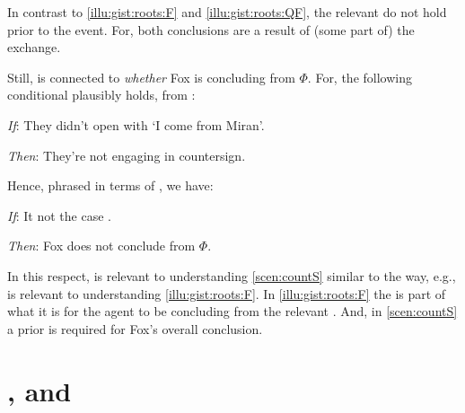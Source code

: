 \begin{note}
  In contrast to  \ref{illu:gist:roots:F} and \ref{illu:gist:roots:QF}, the relevant \fofr{} do not hold prior to the event.
  For, both conclusions are a result of (some part of) the exchange.

  Still,  is connected to \emph{whether} Fox is concluding  from \(\Phi\).
  For, the following conditional plausibly holds, from :

  \begin{itenum}
  \item[\emph{If}:]
    They didn't open with `I come from Miran'.
  \item[\emph{Then}:]
    They're not engaging in countersign.
  \end{itenum}

  \noindent%
  Hence, phrased in terms of , we have:
  \begin{itenum}
  \item[\emph{If}:]
    It not the case .
  \item[\emph{Then}:]
    Fox does not conclude  from \(\Phi\).
  \end{itenum}
  In this respect,  is relevant to understanding \autoref{scen:countS} similar to the way, e.g.,  is relevant to understanding \autoref{illu:gist:roots:F}.
  In \autoref{illu:gist:roots:F} the \fingfr{} is part of what it is for the agent to be concluding  from the relevant \pool{}.
  And, in \autoref{scen:countS} a prior  is required for Fox's overall conclusion.
\end{note}



\section{\qWhy{}, \qHow{} and \issueInclusion{}}
\label{cha:intro:why-how}


